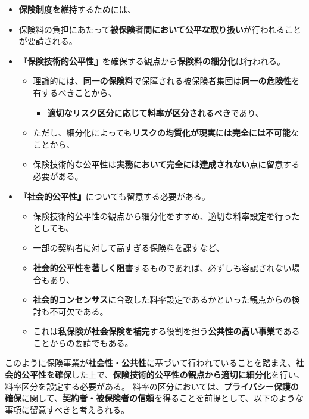 \documentclass[
]{article}
\providecommand{\tightlist}{%
  \setlength{\itemsep}{0pt}\setlength{\parskip}{0pt}}
\begin{document}
\begin{itemize}
\item
  \textbf{保険制度を維持}するためには、
\item
  保険料の負担にあたって\textbf{被保険者間において公平な取り扱い}が行われることが要請される。
\item
  \textbf{『保険技術的公平性』}を確保する観点から\textbf{保険料の細分化}は行われる。

  \begin{itemize}
  \tightlist
  \item
    理論的には、\textbf{同一の保険料}で保障される被保険者集団は\textbf{同一の危険性}を有するべきことから、

    \begin{itemize}
    \tightlist
    \item
      \textbf{適切なリスク区分に応じて料率が区分されるべき}であり、
    \end{itemize}
  \item
    ただし、細分化によっても\textbf{リスクの均質化が現実には完全には不可能}なことから、
  \item
    保険技術的な公平性は\textbf{実務において完全には達成されない}点に留意する必要がある。
  \end{itemize}
\item
  \textbf{『社会的公平性』}についても留意する必要がある。

  \begin{itemize}
  \tightlist
  \item
    保険技術的公平性の観点から細分化をすすめ、適切な料率設定を行ったとしても、
  \item
    一部の契約者に対して高すぎる保険料を課すなど、
  \item
    \textbf{社会的公平性を著しく阻害}するものであれば、必ずしも容認されない場合もあり、
  \item
    \textbf{社会的コンセンサス}に合致した料率設定であるかといった観点からの検討も不可欠である。
  \item
    これは\textbf{私保険が社会保険を補完}する役割を担う\textbf{公共性の高い事業}であることからの要請でもある。
  \end{itemize}
\end{itemize}

このように保険事業が\textbf{社会性・公共性}に基づいて行われていることを踏まえ、\textbf{社会的公平性を確保}した上で、\textbf{保険技術的公平性の観点から適切に細分化}を行い、料率区分を設定する必要がある。
料率の区分においては、\textbf{プライバシー保護の確保}に関して、\textbf{契約者・被保険者の信頼}を得ることを前提として、以下のような事項に留意すべきと考えられる。
\end{document}
